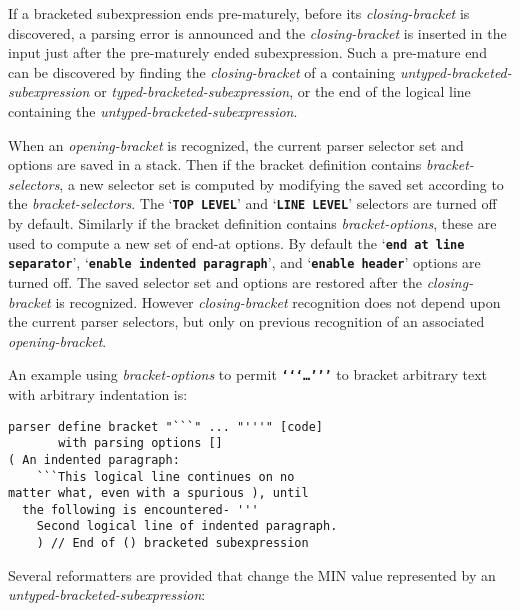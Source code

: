\documentclass[12pt]{article}
\newcommand{\TT}[1]{{\tt \bfseries #1}}
\newenvironment{indpar}[1][0.3in]%
	{\begin{list}{}%
		     {\setlength{\itemsep}{0in}%
		      \setlength{\topsep}{0in}%
		      \setlength{\parsep}{1ex}%
		      \setlength{\labelwidth}{#1}%
		      \setlength{\leftmargin}{#1}%
		      \addtolength{\leftmargin}{\labelsep}}%
	 \item}%
	{\end{list}}
\begin{document}
If a bracketed subexpression ends pre-maturely, before
its {\em closing-bracket} is discovered, a parsing error is
announced and the {\em closing-bracket} is inserted in the input
just after the pre-maturely ended subexpression.  Such a pre-mature end can be
discovered by finding the {\em closing-bracket} of a containing
{\em untyped-bracketed-subexpression} or {\em typed-bracketed-subexpression},
or the end of the logical line
containing the {\em untyped-bracketed-subexpression}.

When an {\em opening-bracket} is recognized, the current parser
selector set and options are saved in a stack.  Then if the
bracket definition contains {\em bracket-selectors},
a new selector set is computed by modifying the saved set
according to the {\em bracket-selectors}.
The `\TT{TOP LEVEL}' and `\TT{LINE LEVEL}' selectors are turned off
by default.
Similarly if the bracket definition contains {\em bracket-options},
these are used to compute a new set of end-at options.
By default the `\TT{end at line separator}',
`\TT{enable indented paragraph}', and `\TT{enable header}' options
are turned off.
The saved selector set and options are restored after the {\em closing-bracket}
is recognized.  However {\em closing-bracket}
recognition does not depend
upon the current parser selectors, but only on previous recognition
of an associated {\em opening-bracket}.

An example using {\em bracket-options} to permit
\TT{`{}`{}`\ldots'{}'{}'}
to bracket arbitrary text with arbitrary indentation is:
\begin{indpar}\begin{verbatim}
parser define bracket "```" ... "'''" [code]
       with parsing options []
( An indented paragraph:
    ```This logical line continues on no
matter what, even with a spurious ), until
  the following is encountered- '''
    Second logical line of indented paragraph.
    ) // End of () bracketed subexpression
\end{verbatim}\end{indpar}

Several reformatters are provided that change the MIN value
represented by an {\em untyped-bracketed-subexpression}:
\end{document}
